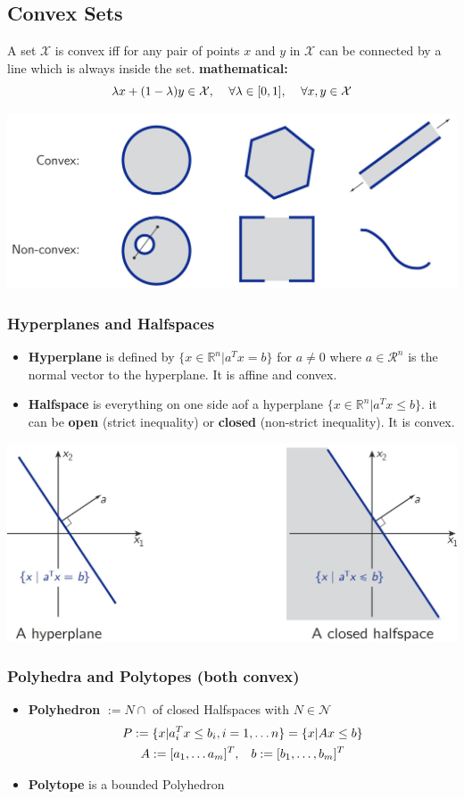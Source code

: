 \subsection{Convex Sets}
A set $\mathcal{X}$ is convex iff for any pair of points $x$ and $y$ in $\mathcal{X}$ can be connected by a line which is always inside the set.
\textbf{mathematical:} \[\lambda x + (1-\lambda) y\in \mathcal{X}, \hspace{4mm} \forall \lambda\in [0,1], \hspace{4mm} \forall x,y \in \mathcal{X} \]
\begin{center}
    \includegraphics[width= 0.6\linewidth]{MPC_summary/Images/Convex_Non_Convex.jpg}
\end{center}
\subsubsection{Hyperplanes and Halfspaces}
\begin{itemize}
    \item \textbf{Hyperplane} is defined by $\{x\in\mathbb{R}^n| a^Tx = b \}$ for $a \neq 0$ where $a \in \mathcal{R}^n$ is the normal vector to the hyperplane. It is affine and convex.
    \item \textbf{Halfspace} is everything on one side aof a hyperplane $\{x \in \mathbb{R}^n | a^T x \leq b\}$. it can be \textbf{open} (strict inequality) or \textbf{closed} (non-strict inequality). It is convex.
\end{itemize}
\begin{center}
    \includegraphics[width= 0.6\linewidth]{MPC_summary/Images/hyperplane_halfspaces.jpg}
\end{center}
\subsubsection{Polyhedra and Polytopes \tiny{(both convex)}}
\begin{itemize}
    \item \textbf{Polyhedron} $:= N \cap$ of closed Halfspaces with $N \in \mathcal{N}$  
    \begin{gather*}P := \{x|a^T_i x \leq b_i,i=1, \dots n\} = \{x|Ax \leq b\}\\
    A := [a_1, \dots a_m]^T,\hspace{3mm} b := [b_1,\dots,b_m]^T
    \end{gather*}
    \item \textbf{Polytope} is a bounded Polyhedron
\end{itemize}
